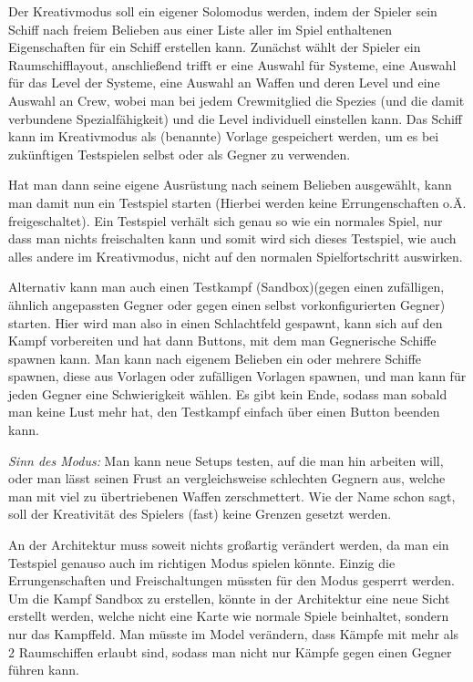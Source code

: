 \documentclass[fontsize=12pt,paper=a4,twoside]{scrartcl}
\begin{document}
{
Der Kreativmodus soll ein eigener Solomodus werden, indem der Spieler sein Schiff nach freiem Belieben aus einer Liste aller im Spiel enthaltenen Eigenschaften für ein Schiff erstellen kann. Zunächst wählt der Spieler ein Raumschifflayout, anschließend trifft er eine Auswahl für Systeme, eine Auswahl für das Level der Systeme, eine Auswahl an Waffen und deren Level und eine Auswahl an Crew, wobei man bei jedem Crewmitglied die Spezies (und die damit verbundene Spezialfähigkeit) und die Level individuell einstellen kann. 
Das Schiff kann im Kreativmodus als (benannte) Vorlage gespeichert werden, um es bei zukünftigen Testspielen selbst oder als Gegner zu verwenden.

Hat man dann seine eigene Ausrüstung nach seinem Belieben ausgewählt, kann man damit nun ein Testspiel starten (Hierbei werden keine Errungenschaften o.Ä. freigeschaltet). Ein Testspiel verhält sich genau so wie ein normales Spiel, nur dass man nichts freischalten kann und somit wird sich dieses Testspiel, wie auch alles andere im Kreativmodus, nicht auf den normalen Spielfortschritt auswirken. 

Alternativ kann man auch einen Testkampf (Sandbox)(gegen einen zufälligen, ähnlich angepassten Gegner oder gegen einen selbst vorkonfigurierten Gegner) starten. Hier wird man also in einen Schlachtfeld gespawnt, kann sich auf den Kampf vorbereiten und hat dann Buttons, mit dem man Gegnerische Schiffe spawnen kann. Man kann nach eigenem Belieben ein oder mehrere Schiffe spawnen, diese aus Vorlagen oder zufälligen Vorlagen spawnen, und man kann für jeden Gegner eine Schwierigkeit wählen. Es gibt kein Ende, sodass man sobald man keine Lust mehr hat, den Testkampf einfach über einen Button beenden kann. 

\textit{Sinn des Modus:}
Man kann neue Setups testen, auf die man hin arbeiten will, oder man lässt seinen Frust an vergleichsweise schlechten Gegnern aus, welche man mit viel zu übertriebenen Waffen zerschmettert. Wie der Name schon sagt, soll der Kreativität des Spielers (fast) keine Grenzen gesetzt werden.

An der Architektur muss soweit nichts großartig verändert werden, da man ein Testspiel genauso auch im richtigen Modus spielen könnte. Einzig die Errungenschaften und Freischaltungen müssten für den Modus gesperrt werden. Um die Kampf Sandbox zu erstellen, könnte in der Architektur eine neue Sicht erstellt werden, welche nicht eine Karte wie normale Spiele beinhaltet, sondern nur das Kampffeld.  Man müsste im Model verändern, dass Kämpfe mit mehr als 2 Raumschiffen erlaubt sind, sodass man nicht nur Kämpfe gegen einen Gegner führen kann. 

}
\end{document}
